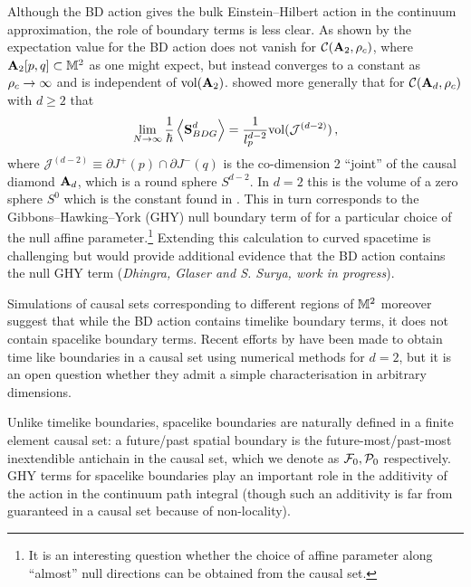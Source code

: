 Although the BD action gives the bulk Einstein--Hilbert action in the
continuum approximation, the role of boundary terms is less clear. As shown by 
\cite{gaussbonnet} the expectation value for the BD action does not vanish for  $\mathcal C(\mathbf A_2,\rho_c)$, where $\mathbf A_2[p,q]
\subset \mathbb M^2$ as one might expect,
but instead converges to a constant
as $\rho_c \rightarrow \infty$ and is independent of $\mathrm{vol}(\mathbf A_2)$.   
\cite{bdjs} showed more generally that  for $\mathcal C(\mathbf A_d,\rho_c)$ with   $d \geq 2$ that 
\begin{equation} 
\lim_{N \rightarrow \infty} \frac{1}{\hbar}\left\langle \textbf{S}_{BDG}^d \right\rangle=  \frac{1}{l_p^{d-2}} \mathrm{vol}
(\mathcal{J}^{(d-2)}) \,,  
\label{result} 
\end{equation} 
where $\mathcal{J}^{(d-2)} \equiv \partial J^+(p) \cap \partial J^-(q)$ is the co-dimension 2 ``joint'' of the causal
diamond $\mathbf A_d$, which is a round sphere $S^{d-2}$.  In  $d=2$ this is the volume of a  zero sphere $S^0$ which is the
constant found in 
\citep{gaussbonnet}.  This in turn corresponds to the Gibbons--Hawking--York (GHY) null   boundary term of \citep{jsss,lmps} for a
particular choice of the null affine parameter.\footnote{It is an interesting question whether the choice of affine
  parameter along ``almost''  null directions can be obtained from the causal set.} Extending this calculation to curved spacetime  is 
challenging but would provide additional evidence that the BD action contains the null GHY term ({\it Dhingra, Glaser and
S. Surya, work in progress}).      

Simulations of causal sets corresponding to different regions of $\mathbb M^2$  moreover suggest that while the  BD action contains timelike boundary terms, it does not  contain spacelike boundary terms.  Recent  efforts by \cite{tlbdry}  have been made to obtain 
time like boundaries  in a causal set using numerical methods for $d=2$, but it is an open question whether they admit a simple
characterisation in arbitrary dimensions. 
 
Unlike timelike boundaries, spacelike boundaries are naturally defined in a finite element causal set: a future/past spatial
boundary is the future-most/past-most inextendible antichain in the causal set, which we denote as $\mathcal F_0,\mathcal P_0$
respectively.  GHY terms for spacelike boundaries play an important role in the additivity of the action in the
continuum path integral (though  such an additivity is far from guaranteed in a causal set because of non-locality).

